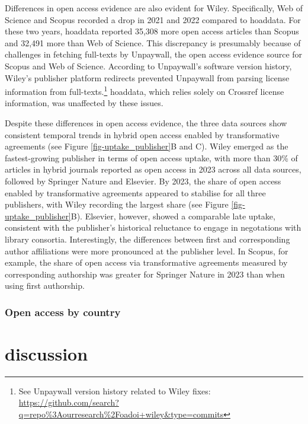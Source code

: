 \documentclass[a4paper,man,floatsintext,longtable,noextraspace,10pt]{apa6}
\begin{document}
Differences in open access evidence are also evident for Wiley.
Specifically, Web of Science and Scopus recorded a drop in 2021 and 2022
compared to hoaddata. For these two years, hoaddata reported 35,308 more
open access articles than Scopus and 32,491 more than Web of Science.
This discrepancy is presumably because of challenges in fetching
full-texts by Unpaywall, the open access evidence source for Scopus and
Web of Science. According to Unpaywall's software version history,
Wiley's publisher platform redirects prevented Unpaywall from parsing
license information from full-texts.\footnote{See Unpaywall version
  history related to Wiley fixes:
  \url{https://github.com/search?q=repo\%3Aourresearch\%2Foadoi+wiley&type=commits}}
hoaddata, which relies solely on Crossref license information, was
unaffected by these issues.

Despite these differences in open access evidence, the three data
sources show consistent temporal trends in hybrid open access enabled by
transformative agreements (see Figure \ref{fig-uptake_publisher}B and
C). Wiley emerged as the fastest-growing publisher in terms of open
access uptake, with more than 30\% of articles in hybrid journals
reported as open access in 2023 across all data sources, followed by
Springer Nature and Elsevier. By 2023, the share of open access enabled
by transformative agreements appeared to stabilise for all three
publishers, with Wiley recording the largest share (see Figure
\ref{fig-uptake_publisher}B). Elsevier, however, showed a comparable
late uptake, consistent with the publisher's historical reluctance to
engage in negotations with library consortia. Interestingly, the
differences between first and corresponding author affiliations were
more pronounced at the publisher level. In Scopus, for example, the
share of open access via transformative agreements measured by
corresponding authorship was greater for Springer Nature in 2023 than
when using first authorship.

\subsubsection{Open access by country}\label{open-access-by-country}

\section*{discussion}\label{discussion}
\end{document}
